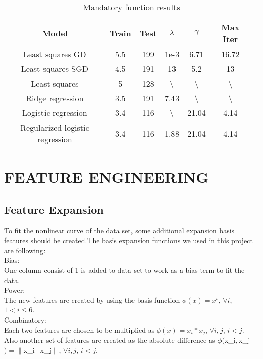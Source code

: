 \documentclass[letterpaper, 10 pt, conference]{ieeeconf}  %
\begin{document}
\begin{table}[h!]
\scriptsize
\begin{tabular}{| c | c | c | c | c | c | c |}
      \hline
      Model          & Train & Test & $\lambda$ & $\gamma$ & Max Iter  \\
      \hline 
      Least squares GD   & 5.5  &  199     & 1e-3 &  6.71         & 16.72     \\
      \hline
      Least squares SGD     & 4.5  &  191     & 13    &  5.2          & 13      \\
      \hline 
      Least squares & 5    &  128     & \textbackslash   &  \textbackslash          & \textbackslash        \\
      \hline
      Ridge regression  & 3.5  &  191     & 7.43  &  \textbackslash        & \textbackslash    \\
      \hline
      Logistic regression & 3.4  &  116     & \textbackslash  &  21.04        & 4.14      \\
      \hline
      Regularized logistic regression & 3.4  &  116     & 1.88  &  21.04  & 4.14     \\
      \hline  
\end{tabular} 
\caption{Mandatory function results}
\label{table:test}
\end{table}

\section{FEATURE ENGINEERING}

\subsection{Feature Expansion}
To fit the nonlinear curve of the data set, some additional expansion basis features should be created.The basis expansion functions we used in this project are following:\\

Bias:\\
One column consist of 1 is added to data set to work as a bias term to fit the data.\\

Power:\\
The new features are created by using the basis function  $\phi(x) = x^i$,    $ \forall i$, $1<i\leq6$.\\  

Combinatory:\\
Each two features are chosen to be multiplied as $\phi(x) = x_i*x_j$, $ \forall i,j$, $i<j.$
Also another set of features are created as the absolute difference as  $\phi($x_i$,$x_j$) = \|$x_i$ - $x_j$\|$, $\forall i,j$, $i<j$.\\
\end{document}
